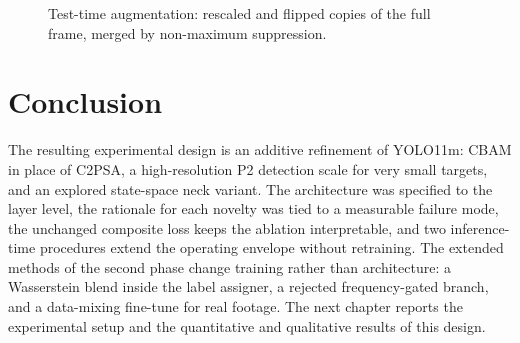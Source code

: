 \begin{figure}[tbp]
  \centering
  \caption[Test-time augmentation.]{Test-time augmentation: rescaled and
  flipped copies of the full frame, merged by non-maximum suppression.}
  \label{fig:ttapipe}
\end{figure}

\section{Conclusion}
The resulting experimental design is an additive refinement of YOLO11m: CBAM
in place of C2PSA, a high-resolution P2 detection scale
for very small targets, and an explored state-space neck variant. The
architecture was specified to the layer level, the rationale for each novelty
was tied to a measurable failure mode, the unchanged composite loss keeps the
ablation interpretable, and two inference-time procedures extend the operating
envelope without retraining. The extended methods of the second phase change
training rather than architecture: a Wasserstein blend inside the label
assigner, a rejected frequency-gated branch, and a data-mixing fine-tune for
real footage. The next chapter reports the experimental setup and the
quantitative and qualitative results of this design.
